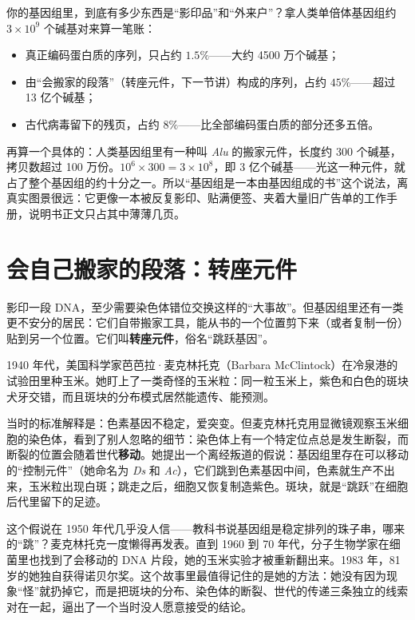 \begin{qiaoliang}
你的基因组里，到底有多少东西是“影印品”和“外来户”？拿人类单倍体基因组约 $3\times 10^{9}$ 个碱基对来算一笔账：

\begin{itemize}[itemsep=2pt]
\item 真正编码蛋白质的序列，只占约 $1.5\%$——大约 4500 万个碱基；
\item 由“会搬家的段落”（转座元件，下一节讲）构成的序列，占约 $45\%$——超过 13 亿个碱基；
\item 古代病毒留下的残页，占约 $8\%$——比全部编码蛋白质的部分还多五倍。
\end{itemize}

再算一个具体的：人类基因组里有一种叫 \emph{Alu} 的搬家元件，长度约 300 个碱基，拷贝数超过 100 万份。$10^{6}\times 300=3\times 10^{8}$，即 3 亿个碱基——光这一种元件，就占了整个基因组的约十分之一。所以“基因组是一本由基因组成的书”这个说法，离真实图景很远：它更像一本被反复影印、贴满便签、夹着大量旧广告单的工作手册，说明书正文只占其中薄薄几页。
\end{qiaoliang}

\section{会自己搬家的段落：转座元件}

影印一段 DNA，至少需要染色体错位交换这样的“大事故”。但基因组里还有一类更不安分的居民：它们自带搬家工具，能从书的一个位置剪下来（或者复制一份）贴到另一个位置。它们叫\textbf{转座元件}，俗名“跳跃基因”。

\begin{zhengju}
1940 年代，美国科学家芭芭拉·麦克林托克（Barbara McClintock）在冷泉港的试验田里种玉米。她盯上了一类奇怪的玉米粒：同一粒玉米上，紫色和白色的斑块犬牙交错，而且斑块的分布模式居然能遗传、能预测。

当时的标准解释是：色素基因不稳定，爱突变。但麦克林托克用显微镜观察玉米细胞的染色体，看到了别人忽略的细节：染色体上有一个特定位点总是发生断裂，而断裂的位置会随着世代\textbf{移动}。她提出一个离经叛道的假说：基因组里存在可以移动的“控制元件”（她命名为 \emph{Ds} 和 \emph{Ac}），它们跳到色素基因中间，色素就生产不出来，玉米粒出现白斑；跳走之后，细胞又恢复制造紫色。斑块，就是“跳跃”在细胞后代里留下的足迹。

这个假说在 1950 年代几乎没人信——教科书说基因组是稳定排列的珠子串，哪来的“跳”？麦克林托克一度懒得再发表。直到 1960 到 70 年代，分子生物学家在细菌里也找到了会移动的 DNA 片段，她的玉米实验才被重新翻出来。1983 年，81 岁的她独自获得诺贝尔奖。这个故事里最值得记住的是她的方法：她没有因为现象“怪”就扔掉它，而是把斑块的分布、染色体的断裂、世代的传递三条独立的线索对在一起，逼出了一个当时没人愿意接受的结论。
\end{zhengju}


